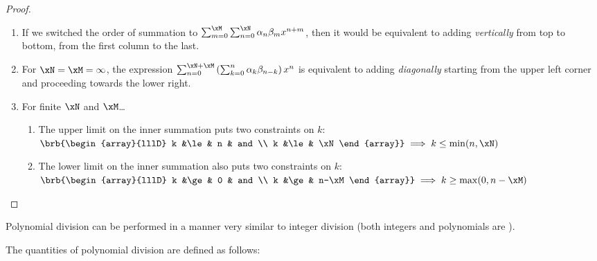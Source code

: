 \begin{proof}
\begin{enumerate}
\item If we switched the order of summation to 
      $\sum_{m=0}^\xM \sum_{n=0}^\xN \alpha_n \beta_m x^{n+m}$,
      then it would be equivalent to adding {\em vertically} 
      from top to bottom, 
      from the first column to the last.

\item For $\xN=\xM=\infty$, the expression
      $\sum_{n=0}^{\xN+\xM} \left(\sum_{k=0}^n \alpha_k \beta_{n-k} \right) x^n$
      is equivalent to adding {\em diagonally} 
      starting from the upper left corner and proceeding 
      towards the lower right.

\item For finite $\xN$ and $\xM$\ldots
  \begin{enumerate}
    \item The upper limit on the inner summation puts two constraints on $k$:
      \\\indentx$\brb{\begin{array}{lllD}
        k &\le& n  & and \\
        k &\le& \xN
      \end{array}}
      \implies
      k\le\min(n,\xN)$

    \item The lower limit on the inner summation also puts two constraints on $k$:
      \\\indentx$\brb{\begin{array}{lllD}
        k &\ge& 0     & and \\
        k &\ge& n-\xM
      \end{array}}
      \implies
      k\ge\max(0,n-\xM)$
  \end{enumerate}
\end{enumerate}
\end{proof}

Polynomial division can be performed in a manner very similar to integer division
(both integers and polynomials are ).



\begin{definition}
The quantities of polynomial division are defined as follows:
\end{definition}


